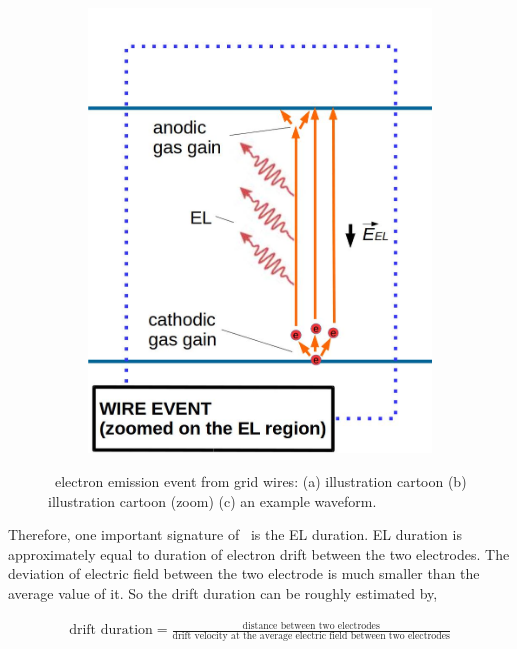 \begin{figure}[!p]
\begin{subfigure}[b]{\halfwidth}
		\includegraphics[width=\figurewidth,clip,trim={0 0 0 0}]{Figures/GasTest/WeiDrawEvent/WirePhotoZ.jpg}
		\caption{}
		\label{fig:ElectronEmissionPulse b}
	\end{subfigure}
	\caption[\gtest\ electron emission event from grid wires]{\gtest\ electron emission event from grid wires: (a) illustration cartoon (b) illustration cartoon (zoom) (c) an example waveform. }
	\label{fig:ElectronEmissionPulse}
\end{figure}

Therefore, one important signature of \eep\ is the EL duration. EL duration is approximately equal to duration of electron drift between the two electrodes. The deviation of electric field between the two electrode is much smaller than the average value of it. So the drift duration can be roughly estimated by, 

\begin{align}
	\text{drift duration} = \frac{\text{distance between two electrodes}}{\text{drift velocity at the average electric field between two electrodes} }
\end{align}

